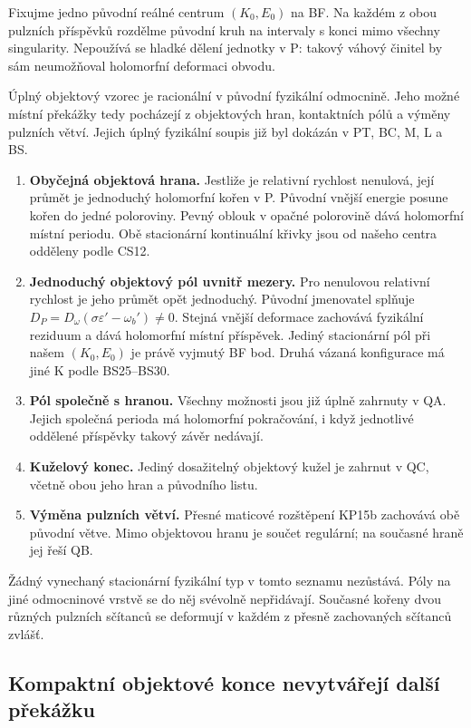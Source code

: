 \documentclass[11pt,a4paper]{article}
\theoremstyle{remark}\newtheorem{remark}[theorem]{Poznámka}
\numberwithin{equation}{section}
\providecommand{\tightlist}{\setlength{\itemsep}{0pt}\setlength{\parskip}{0pt}}
\begin{document}
Fixujme jedno původní reálné centrum \((K_0,E_0)\) na BF. Na každém z
obou pulzních příspěvků rozdělme původní kruh na intervaly s konci mimo
všechny singularity. Nepoužívá se hladké dělení jednotky v P: takový
váhový činitel by sám neumožňoval holomorfní deformaci obvodu.

Úplný objektový vzorec je racionální v původní fyzikální odmocnině. Jeho
možné místní překážky tedy pocházejí z objektových hran, kontaktních
pólů a výměny pulzních větví. Jejich úplný fyzikální soupis již byl
dokázán v PT, BC, M, L a BS.

\begin{enumerate}
\def\labelenumi{\arabic{enumi}.}
\tightlist
\item
  \textbf{Obyčejná objektová hrana.} Jestliže je relativní rychlost
  nenulová, její průmět je jednoduchý holomorfní kořen v P. Původní
  vnější energie posune kořen do jedné poloroviny. Pevný oblouk v opačné
  polorovině dává holomorfní místní periodu. Obě stacionární kontinuální
  křivky jsou od našeho centra odděleny podle CS12.
\item
  \textbf{Jednoduchý objektový pól uvnitř mezery.} Pro nenulovou
  relativní rychlost je jeho průmět opět jednoduchý. Původní jmenovatel
  splňuje \(D_P=D_\omega(\sigma\varepsilon'-\omega_b')\ne0\). Stejná
  vnější deformace zachovává fyzikální reziduum a dává holomorfní místní
  příspěvek. Jediný stacionární pól při našem \((K_0,E_0)\) je právě
  vyjmutý BF bod. Druhá vázaná konfigurace má jiné K podle BS25--BS30.
\item
  \textbf{Pól společně s hranou.} Všechny možnosti jsou již úplně
  zahrnuty v QA. Jejich společná perioda má holomorfní pokračování, i
  když jednotlivé oddělené příspěvky takový závěr nedávají.
\item
  \textbf{Kuželový konec.} Jediný dosažitelný objektový kužel je zahrnut
  v QC, včetně obou jeho hran a původního listu.
\item
  \textbf{Výměna pulzních větví.} Přesné maticové rozštěpení KP15b
  zachovává obě původní větve. Mimo objektovou hranu je součet
  regulární; na současné hraně jej řeší QB.
\end{enumerate}

Žádný vynechaný stacionární fyzikální typ v tomto seznamu nezůstává.
Póly na jiné odmocninové vrstvě se do něj svévolně nepřidávají. Současné
kořeny dvou různých pulzních sčítanců se deformují v každém z přesně
zachovaných sčítanců zvlášť.

\hypertarget{kompaktnuxed-objektovuxe9-konce-nevytvuxe1ux159ejuxed-dalux161uxed-pux159ekuxe1ux17eku}{%
\subsection{Kompaktní objektové konce nevytvářejí další
překážku}\label{kompaktnuxed-objektovuxe9-konce-nevytvuxe1ux159ejuxed-dalux161uxed-pux159ekuxe1ux17eku}}
\end{document}

